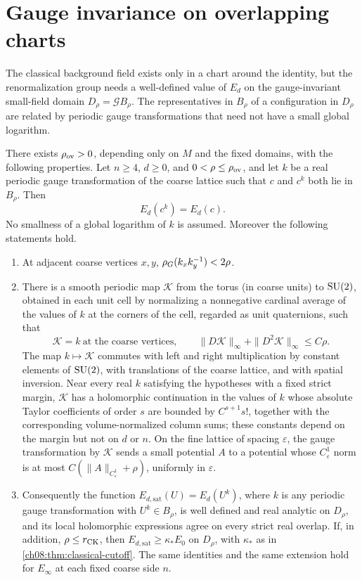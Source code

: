 \section{Gauge invariance on overlapping charts}\label{ch08:sec:overlap}

The classical background field exists only in a chart around the identity, but the renormalization group needs a well-defined value of $E_d$ on the gauge-invariant small-field domain $D_\rho=\mathcal G B_\rho$. The representatives in $B_\rho$ of a configuration in $D_\rho$ are related by periodic gauge transformations that need not have a small global logarithm.

\begin{theorem}\label{ch08:thm:compact-overlap}
There exists $\rho_{\rm ov}>0$, depending only on $M$ and the fixed domains, with the following properties. Let $n\ge4$, $d\ge0$, and $0<\rho\le\rho_{\rm ov}$, and let $k$ be a real periodic gauge transformation of the coarse lattice such that $c$ and $c^k$ both lie in $B_\rho$. Then
\[
 E_d(c^k)=E_d(c).
\]
No smallness of a global logarithm of $k$ is assumed. Moreover the following statements hold.
\begin{enumerate}
\item At adjacent coarse vertices $x,y$, $\rho_G(k_xk_y^{-1})<2\rho$.
\item There is a smooth periodic map $\mathscr K$ from the torus (in coarse units) to $\mathrm{SU}(2)$, obtained in each unit cell by normalizing a nonnegative cardinal average of the values of $k$ at the corners of the cell, regarded as unit quaternions, such that
\[
 \mathscr K=k\ \text{at the coarse vertices},\qquad
 \|D\mathscr K\|_\infty+\|D^2\mathscr K\|_\infty\le C\rho.
\]
The map $k\mapsto\mathscr K$ commutes with left and right multiplication by constant elements of $\mathrm{SU}(2)$, with translations of the coarse lattice, and with spatial inversion. Near every real $k$ satisfying the hypotheses with a fixed strict margin, $\mathscr K$ has a holomorphic continuation in the values of $k$ whose absolute Taylor coefficients of order $s$ are bounded by $C^{s+1}s!$, together with the corresponding volume-normalized column sums; these constants depend on the margin but not on $d$ or $n$. On the fine lattice of spacing $\varepsilon$, the gauge transformation by $\mathscr K$ sends a small potential $A$ to a potential whose $C^1_\varepsilon$ norm is at most $C(\|A\|_{C^1_\varepsilon}+\rho)$, uniformly in $\varepsilon$.
\item Consequently the function $E_{d,\mathrm{sat}}(U)=E_d(U^k)$, where $k$ is any periodic gauge transformation with $U^k\in B_\rho$, is well defined and real analytic on $D_\rho$, and its local holomorphic expressions agree on every strict real overlap. If, in addition, $\rho\le r_{\rm CK}$, then $E_{d,\mathrm{sat}}\ge\kappa_*E_0$ on $D_\rho$, with $\kappa_*$ as in \cref{ch08:thm:classical-cutoff}. The same identities and the same extension hold for $E_\infty$ at each fixed coarse side $n$.
\end{enumerate}
\end{theorem}

